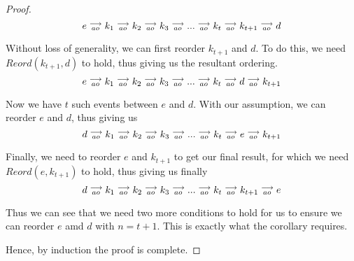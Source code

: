 \begin{proof}
        \[
            e\stackrel{\longrightarrow}{_{ao}}k_1\stackrel{\longrightarrow}{_{ao}}k_2\stackrel{\longrightarrow}{_{ao}}k_3\stackrel{\longrightarrow}{_{ao}}...\stackrel{\longrightarrow}{_{ao}}k_t\stackrel{\longrightarrow}{_{ao}}k_{t+1}\stackrel{\longrightarrow}{_{ao}}d  
        \]

        Without loss of generality, we can first reorder $k_{t+1}$ and $d$. To do this, we need $Reord(k_{t+1}, d)$ to hold, thus giving us the resultant ordering.
        \[
            e\stackrel{\longrightarrow}{_{ao}}k_1\stackrel{\longrightarrow}{_{ao}}k_2\stackrel{\longrightarrow}{_{ao}}k_3\stackrel{\longrightarrow}{_{ao}}...\stackrel{\longrightarrow}{_{ao}}k_t\stackrel{\longrightarrow}{_{ao}}d\stackrel{\longrightarrow}{_{ao}}k_{t+1}  
        \]
        
        Now we have $t$ such events between $e$ and $d$. With our assumption, we can reorder $e$ and $d$, thus giving us 
        \[
            d\stackrel{\longrightarrow}{_{ao}}k_1\stackrel{\longrightarrow}{_{ao}}k_2\stackrel{\longrightarrow}{_{ao}}k_3\stackrel{\longrightarrow}{_{ao}}...\stackrel{\longrightarrow}{_{ao}}k_t\stackrel{\longrightarrow}{_{ao}}e\stackrel{\longrightarrow}{_{ao}}k_{t+1}  
        \]

        Finally, we need to reorder $e$ and $k_{t+1}$ to get our final result, for which we need $Reord(e, k_{t+1})$ to hold, thus giving us finally
        \[
            d\stackrel{\longrightarrow}{_{ao}}k_1\stackrel{\longrightarrow}{_{ao}}k_2\stackrel{\longrightarrow}{_{ao}}k_3\stackrel{\longrightarrow}{_{ao}}...\stackrel{\longrightarrow}{_{ao}}k_t\stackrel{\longrightarrow}{_{ao}}k_{t+1}\stackrel{\longrightarrow}{_{ao}}e  
        \]

        Thus we can see that we need two more conditions to hold for us to ensure we can reorder $e$ amd $d$ with $n = t + 1$. This is exactly what the corollary requires. 

        Hence, by induction the proof is complete. 

        
        
        

\end{proof}
    